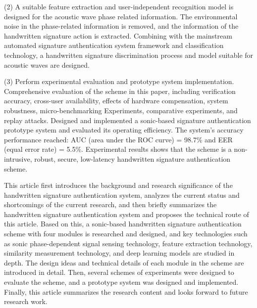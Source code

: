 \begin{englishabstract}
(2) A suitable feature extraction and user-independent recognition model is designed for the acoustic wave phase related information. The environmental noise in the phase-related information is removed, and the information of the handwritten signature action is extracted. Combining with the mainstream automated signature authentication system framework and classification technology, a handwritten signature discrimination process and model suitable for acoustic waves are designed.

(3) Perform experimental evaluation and prototype system implementation. Comprehensive evaluation of the scheme in this paper, including verification accuracy, cross-user availability, effects of hardware compensation, system robustness, micro-benchmarking
Experiments, comparative experiments, and replay attacks. Designed and implemented a sonic-based signature authentication prototype system and evaluated its operating efficiency. The system's accuracy performance reached: AUC (area under the ROC curve) = 98.7\% and EER (equal error rate) = 5.5\%. Experimental results shows that the scheme is a non-intrusive, robust, secure, low-latency handwritten signature authentication scheme.

This article first introduces the background and research significance of the handwritten signature authentication system, analyzes the current status and shortcomings of the current research, and then briefly summarizes the handwritten signature authentication system and proposes the technical route of this article. Based on this, a sonic-based handwritten signature authentication scheme with four modules is researched and designed, and key technologies such as sonic phase-dependent signal sensing technology, feature extraction technology, similarity measurement technology, and deep learning models are studied in depth. The design ideas and technical details of each module in the scheme are introduced in detail. Then, several schemes of experiments were designed to evaluate the scheme, and a prototype system was designed and implemented. Finally, this article summarizes the research content and looks forward to future research work.

\end{englishabstract}

